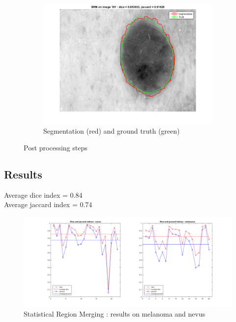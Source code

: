 \documentclass[a4paper,10pt]{article}
\begin{document}
\begin{figure}[h]
\begin{subfigure}{0.329\linewidth}
		\label{fig:srm-reg}
	\end{subfigure}
	\begin{subfigure}{0.329\linewidth}			
		\includegraphics[width=0.99\linewidth]{../results/srm/srm-segt-181}
		\caption{Segmentation (red) and ground truth (green)}
		\label{fig:srm-seg}
	\end{subfigure}
	\caption{Post processing steps}
	\label{fig:srm-steps}
\end{figure}


\subsection{Results}

Average dice index = 0.84\\
Average jaccard index = 0.74

\begin{figure}
	\centering
	\includegraphics[width=0.9\linewidth]{../results/srm/dice-jaccard-srm-2}
	\caption{Statistical Region Merging : results on melanoma and nevus}
	\label{fig:srm-melaVSnev}
\end{figure}
\end{document}
